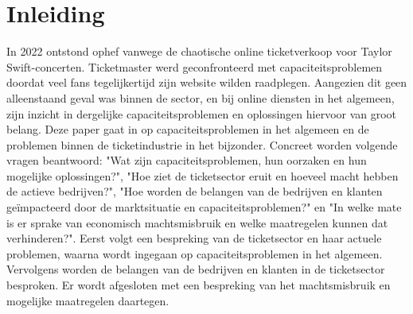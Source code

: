 
\section{Inleiding}

In 2022 ontstond ophef vanwege de chaotische online ticketverkoop voor 
Taylor Swift-concerten. Ticketmaster %
werd geconfronteerd met capaciteitsproblemen doordat veel fans %
tegelijkertijd zijn website wilden raadplegen. Aangezien dit geen alleenstaand 
geval was binnen de sector, en bij online diensten in het algemeen, zijn inzicht in 
dergelijke capaciteitsproblemen en oplossingen hiervoor van groot belang. %
Deze paper gaat in op capaciteitsproblemen in het algemeen en de problemen
binnen de ticketindustrie in het bijzonder. Concreet worden volgende vragen
beantwoord: "Wat zijn capaciteitsproblemen, hun oorzaken en hun mogelijke
oplossingen?", "Hoe ziet de ticketsector eruit en hoeveel macht hebben de
actieve bedrijven?", "Hoe worden de belangen van de bedrijven en klanten
geïmpacteerd door de marktsituatie en capaciteitsproblemen?" en
"In welke mate is er sprake van economisch machtsmisbruik en welke maatregelen
kunnen dat verhinderen?". Eerst volgt een bespreking van de ticketsector en
haar actuele problemen, waarna wordt ingegaan op capaciteitsproblemen
in het algemeen. Vervolgens worden de belangen van de bedrijven en klanten
in de ticketsector besproken. Er wordt afgesloten met een bespreking van het
machtsmisbruik en mogelijke maatregelen daartegen.